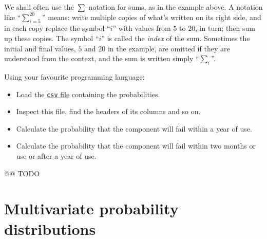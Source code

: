 \documentclass[
  a4paper,
  DIV=11,
  numbers=noendperiod,
  oneside]{scrreprt}
\providecommand{\tightlist}{%
  \setlength{\itemsep}{0pt}\setlength{\parskip}{0pt}}\usepackage{longtable,booktabs,array}
\begin{document}
\begin{tcolorbox}[enhanced jigsaw, opacityback=0, breakable, title={Sum notation}, coltitle=black, colbacktitle=quarto-callout-note-color!10!white, colframe=quarto-callout-note-color-frame, colback=white, bottomtitle=1mm, opacitybacktitle=0.6, bottomrule=.15mm, arc=.35mm, titlerule=0mm, toptitle=1mm, rightrule=.15mm, left=2mm, toprule=.15mm, leftrule=.75mm]

We shall often use the \(\sum\)-notation for sums, as in the example
above. A notation like {``\(\displaystyle\sum_{i=5}^{20}\)''} means:
write multiple copies of what's written on its right side, and in each
copy replace the symbol {``\(i\)''} with values from \(5\) to {\(20\),}
in turn; then sum up these copies. The symbol {``\(i\)''} is called the
\emph{index} of the sum. Sometimes the initial and final values, \(5\)
and \(20\) in the example, are omitted if they are understood from the
context, and the sum is written simply {``\(\displaystyle\sum_{i}\)''.}

\end{tcolorbox}

\begin{tcolorbox}[enhanced jigsaw, opacityback=0, breakable, title={\faIcon{user-edit} Exercise}, coltitle=black, colbacktitle=quarto-callout-caution-color!10!white, colframe=quarto-callout-caution-color-frame, colback=white, bottomtitle=1mm, opacitybacktitle=0.6, bottomrule=.15mm, arc=.35mm, titlerule=0mm, toptitle=1mm, rightrule=.15mm, left=2mm, toprule=.15mm, leftrule=.75mm]

Using your favourite programming language:

\begin{itemize}
\tightlist
\item
  Load the \href{failure_probability.csv}{\texttt{csv} file} containing
  the probabilities.
\item
  Inspect this file, find the headers of its columns and so on.
\item
  Calculate the probability that the component will fail within a year
  of use.
\item
  Calculate the probability that the component will fail within two
  months or use or after a year of use.
\end{itemize}

\end{tcolorbox}

@@ TODO

\hypertarget{multivariate-probability-distributions}{%
\chapter{Multivariate probability
distributions}\label{multivariate-probability-distributions}}
\end{document}
